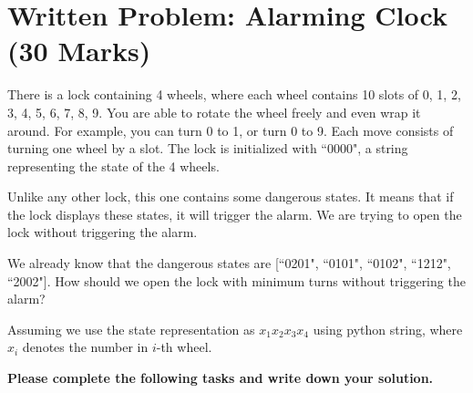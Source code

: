 \documentclass[12pt]{article}
\begin{document}
\section{Written Problem: Alarming Clock (30 Marks)}
There is a lock containing 4 wheels, where each wheel contains 10 slots of 0, 1, 2, 3, 4, 5, 6, 7, 8, 9. You are able to rotate the wheel freely and even wrap it around. For example, you can turn 0 to 1, or turn 0 to 9. Each move consists of turning one wheel by a slot. The lock is initialized with ``0000", a string representing the state of the 4 wheels.

Unlike any other lock, this one contains some dangerous states. It means that if the lock displays these states, it will trigger the alarm. We are trying to open the lock without triggering the alarm.

We already know that the dangerous states are [``0201", ``0101", ``0102", ``1212", ``2002"]. How should we open the lock with minimum turns without triggering the alarm?

Assuming we use the state representation as $x_1x_2x_3x_4$ using python string, where $x_i$ denotes the number in $i$-th wheel.


    {\bf Please complete the following tasks and write down your solution.}
\end{document}
